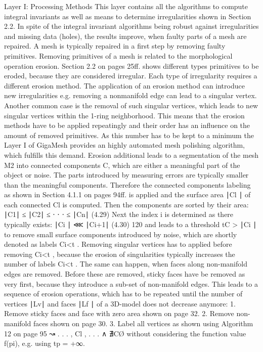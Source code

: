 \documentclass[openany]{book}
\begin{document}
Layer I: Processing Methods
This layer contains all the algorithms to compute integral invariants as well as 
means to determine irregularities shown in Section 2.2. In spite of the integral 
invariant algorithms being robust against irregularities and missing data 
(holes), the results improve, when faulty parts of a mesh are repaired. A mesh is 
typically repaired in a first step by removing faulty primitives.
Removing primitives of a mesh is related to the morphological operation erosion. 
Section 2.2 on pages 25ff. shows different types primitives to be eroded, because 
they are considered irregular. Each type of irregularity requires a different 
erosion method. The application of an erosion method can introduce new 
irregularities e.g. removing a nonmanifold edge can lead to a singular vertex. 
Another common case is the removal of such singular vertices, which leads to new 
singular vertices within the 1-ring neighborhood. This means that the erosion 
methods have to be applied repeatingly and their order has an influence on the 
amount of removed primitives. As this number has to be kept to a minimum the 
Layer I of GigaMesh provides an highly automated mesh polishing algorithm, which 
fulfills this demand. Erosion additional leads to a segmentation of the mesh M2 
into connected components C, which are either a meaningful part of the object or 
noise. The parts introduced by measuring errors are typically smaller than the 
meaningful components.
Therefore the connected components labeling as shown in Section 4.1.1 on pages 
94ff. is applied and the surface area ∣Cl ∣ of each connected Cl is computed. 
Then the components are sorted by their area: ∣C1∣ ≤ ∣C2∣ ≤ ⋅ ⋅ ⋅ ≤ ∣Cn∣ (4.29) 
Next the index i is determined as there typically exists: ∣Ci ∣ ⋘ ∣Ci+1∣ (4.30) 
120 and leads to a threshold tC > ∣Ci ∣ to remove small surface components 
introduced by noise, which are shortly denoted as labels Ci<t .
Removing singular vertices has to applied before removing Ci<t , because the 
erosion of singularities typically increases the number of labels Ci<t . The 
same can happen, when faces along non-manifold edges are removed. Before these 
are removed, sticky faces have be removed as very first, because they introduce 
a sub-set of non-manifold edges. This leads to a sequence of erosion operations, 
which has to be repeated until the number of vertices ∣Lv∣ and faces ∣Lf ∣ of a 
3D-model does not decrease anymore:
1. Remove sticky faces and face with zero area shown on page 32.
2. Remove non-manifold faces shown on page 30.
3. Label all vertices as shown using Algorithm 12 on page 95 ↝ {. . . , Cl , . 
. . } ∧ ∄CØ without considering the function value f(pi), e.g. using tp = +∞.
\end{document}
